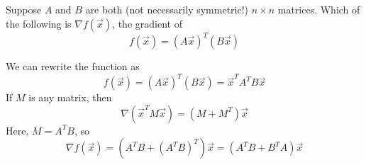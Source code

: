 \documentclass[11pt]{article}
\begin{document}



\begin{prob}
Suppose $A$ and $B$ are both (not necessarily symmetric!) $n \times n$ matrices. Which of the following is $\nabla f(\vec x)$, the gradient of $$f(\vec x) = (A \vec x)^T (B \vec x)$$

     
\begin{solution}
We can rewrite the function as
\[
f(\vec x) = (A\vec x)^T(B\vec x) = \vec x^T A^T B \vec x
\]
If $M$ is any matrix, then
\[
\nabla(\vec x^T M \vec x) = (M + M^T)\vec x
\]
Here, $M = A^TB$, so
\[
\nabla f(\vec x) = \left(A^TB + (A^TB)^T\right)\vec x = \boxed{(A^TB + B^TA)\vec x}
\]
\end{solution}
\end{prob}

\vspace{0.3in}
\end{document}
